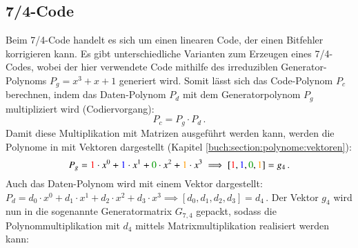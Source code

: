 \subsection{7/4-Code
\label{mceliece:subsection:seven_four}}
Beim 7/4-Code handelt es sich um einen linearen Code,
der einen Bitfehler korrigieren kann.
Es gibt unterschiedliche Varianten zum Erzeugen eines 7/4-Codes,
wobei der hier verwendete Code mithilfe des irreduziblen Generator-Polynoms $P_g = x^3 +x + 1$ generiert wird.
Somit lässt sich das Code-Polynom $P_c$ berechnen, indem das Daten-Polynom $P_d$ mit dem Generatorpolynom $P_g$ multipliziert wird (Codiervorgang):
\[
    P_c=P_g \cdot P_d\,.
\]
Damit diese Multiplikation mit Matrizen ausgeführt werden kann, werden die Polynome in mit Vektoren dargestellt (Kapitel \ref{buch:section:polynome:vektoren}):
\[
    P_g = \textcolor{red}{1}\cdot x^0 + \textcolor{blue}{1}\cdot x^1 + \textcolor{darkgreen}{0}\cdot x^2 + \textcolor{orange}{1}\cdot x^3 \implies
    [\textcolor{red}{1}, \textcolor{blue}{1} ,\textcolor{darkgreen}{0}, \textcolor{orange}{1}] = g_4\,.
\]
Auch das Daten-Polynom wird mit einem Vektor dargestellt: $P_d = d_0 \cdot x^0 + d_1 \cdot x^1 + d_2 \cdot x^2 + d_3 \cdot x^3 \implies [d_0, d_1, d_2, d_3] = d_4$\,.
Der Vektor $g_4$ wird nun in die sogenannte Generatormatrix $G_{7,4}$ gepackt,
sodass die Polynommultiplikation mit $d_4$ mittels Matrixmultiplikation realisiert werden kann:

